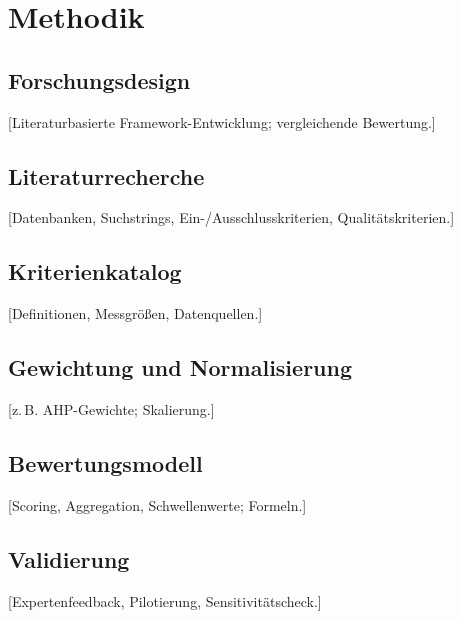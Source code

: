 \chapter{Methodik}

\section{Forschungsdesign}
[Literaturbasierte Framework-Entwicklung; vergleichende Bewertung.]

\section{Literaturrecherche}
[Datenbanken, Suchstrings, Ein-/Ausschlusskriterien, Qualitätskriterien.]

\section{Kriterienkatalog}
[Definitionen, Messgrößen, Datenquellen.]

\section{Gewichtung und Normalisierung}
[z.\,B. AHP-Gewichte; Skalierung.]

\section{Bewertungsmodell}
[Scoring, Aggregation, Schwellenwerte; Formeln.]

\section{Validierung}
[Expertenfeedback, Pilotierung, Sensitivitätscheck.]
